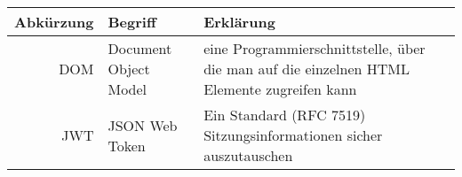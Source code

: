 
\begin{table}[H]
    \begin{tabular}{r|l|p{}}
        Abkürzung & Begriff & Erklärung \\ \hline
        DOM & Document Object Model & eine Programmierschnittstelle, über die man auf die einzelnen HTML Elemente zugreifen kann \\ \hline
        JWT & JSON Web Token & Ein Standard (RFC 7519) Sitzungsinformationen sicher auszutauschen \\ 
    \end{tabular}
\end{table}